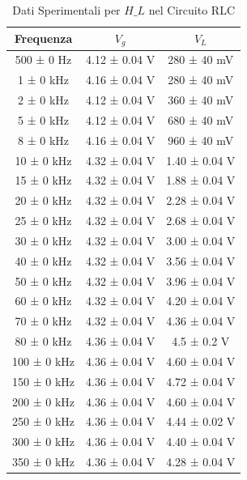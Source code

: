 \documentclass[a4paper]{article}
\begin{document}
\begin{table}[htbp]
\centering
\begin{tabular}{|c|c|c|}
\hline
Frequenza & $V_g$ & $V_L$ \\\hline\hline
500 ± 0 Hz & 4.12 ± 0.04 V & 280 ± 40 mV \\
1 ± 0 kHz & 4.16 ± 0.04 V & 280 ± 40 mV \\
2 ± 0 kHz & 4.12 ± 0.04 V & 360 ± 40 mV \\
5 ± 0 kHz & 4.12 ± 0.04 V & 680 ± 40 mV \\
8 ± 0 kHz & 4.16 ± 0.04 V & 960 ± 40 mV \\
10 ± 0 kHz & 4.32 ± 0.04 V & 1.40 ± 0.04 V \\
15 ± 0 kHz & 4.32 ± 0.04 V & 1.88 ± 0.04 V \\
20 ± 0 kHz & 4.32 ± 0.04 V & 2.28 ± 0.04 V \\
25 ± 0 kHz & 4.32 ± 0.04 V & 2.68 ± 0.04 V \\
30 ± 0 kHz & 4.32 ± 0.04 V & 3.00 ± 0.04 V \\
40 ± 0 kHz & 4.32 ± 0.04 V & 3.56 ± 0.04 V \\
50 ± 0 kHz & 4.32 ± 0.04 V & 3.96 ± 0.04 V \\
60 ± 0 kHz & 4.32 ± 0.04 V & 4.20 ± 0.04 V \\
70 ± 0 kHz & 4.32 ± 0.04 V & 4.36 ± 0.04 V \\
80 ± 0 kHz & 4.36 ± 0.04 V & 4.5 ± 0.2 V \\
100 ± 0 kHz & 4.36 ± 0.04 V & 4.60 ± 0.04 V \\
150 ± 0 kHz & 4.36 ± 0.04 V & 4.72 ± 0.04 V \\
200 ± 0 kHz & 4.36 ± 0.04 V & 4.60 ± 0.04 V \\
250 ± 0 kHz & 4.36 ± 0.04 V & 4.44 ± 0.02 V \\
300 ± 0 kHz & 4.36 ± 0.04 V & 4.40 ± 0.04 V \\
350 ± 0 kHz & 4.36 ± 0.04 V & 4.28 ± 0.04 V \\
\hline
\end{tabular}
\caption{Dati Sperimentali per $H\_L$ nel Circuito RLC}
\end{table}
\end{document}
